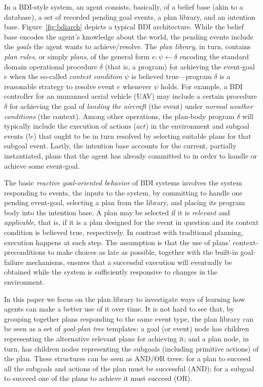 In a BDI-style system, an agent consists, basically, of a belief base (akin to a
database), a set of recorded pending goal events, a plan library, and an
intention base.
Figure~\ref{fig:bdiarch} depicts a typical BDI architecture.
While the belief base encodes the agent's knowledge about the world, the pending
events include the \emph{goals} the agent wants to achieve/resolve.
The \textit{plan library}, in turn, contains \emph{plan rules}, or simply
\emph{plans}, of the general form $e: \psi \leftarrow \delta$ encoding the
standard domain operational procedure $\delta$ (that is, a program) for achieving
the event-goal $e$ when the so-called \textit{context condition} $\psi$ is
believed true---program $\delta$ is a reasonable strategy to resolve event $e$
whenever $\psi$ holds.
For example, a BDI controller for an unmanned aerial vehicle (UAV)
\cite{Karim:AAMAS05,Ziming:AAC07} may include a certain procedure $\delta$ for
achieving the goal of \emph{landing the aircraft} (the event) under \emph{normal
weather conditions} (the context).
Among other operations, the plan-body program $\delta$ will typically include the
execution of actions ($act$) in the environment and subgoal events ($!e$) that
ought to be in turn resolved by selecting suitable plans for that subgoal event.
Lastly, the intention base accounts for the current, partially instantiated,
plans that the agent has already committed to in order to handle or achieve some
event-goal.


The basic \emph{reactive goal-oriented behavior} of BDI systems involves the
system responding to events, the inputs to the system, by committing to handle
one pending event-goal, selecting a plan from the library, and placing its
program body  into the intention base.
A plan may be selected if it is \textit{relevant} and \textit{applicable}, that
is, if it is a plan designed for the event in question and its context condition
is believed true, respectively.
In contrast with traditional planning, execution happens at each step. The
assumption is that the use of plans' context-preconditions to make choices as
late as possible, together with the built-in goal-failure mechanisms, ensures
that a successful execution will eventually be obtained while the system is
sufficiently responsive to changes in the environment.

In this paper we focus on the plan library to
investigate ways of learning how agents can make a better use of it over time.
It is not hard to see that, by grouping together plans responding to the same
event type, the plan library can be seen as a set of \emph{goal-plan tree}
templates: a goal (or event) node has children representing the alternative
relevant plans for achieving it; and a plan node, in turn, has children nodes
representing the subgoals (including primitive actions) of the plan.
These structures can be seen as AND/OR trees: for a plan to succeed all the
subgoals and actions of the plan must be successful (AND); for a subgoal to
succeed one of the plans to achieve it must succeed (OR).




